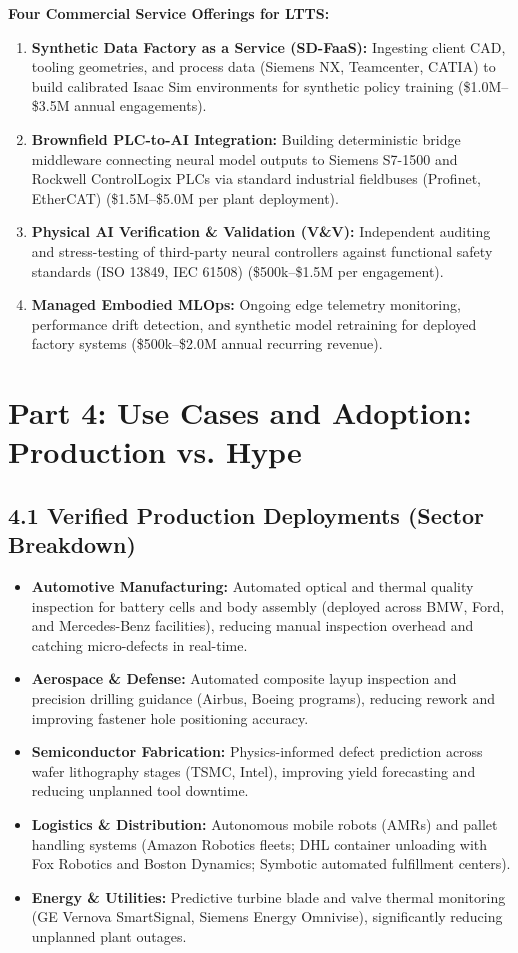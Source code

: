 \documentclass[11pt,a4paper]{article}
\begin{document}
\textbf{Four Commercial Service Offerings for LTTS:}
\begin{enumerate}
    \item \textbf{Synthetic Data Factory as a Service (SD-FaaS):} Ingesting client CAD, tooling geometries, and process data (Siemens NX, Teamcenter, CATIA) to build calibrated Isaac Sim environments for synthetic policy training (\$1.0M--\$3.5M annual engagements).
    \item \textbf{Brownfield PLC-to-AI Integration:} Building deterministic bridge middleware connecting neural model outputs to Siemens S7-1500 and Rockwell ControlLogix PLCs via standard industrial fieldbuses (Profinet, EtherCAT) (\$1.5M--\$5.0M per plant deployment).
    \item \textbf{Physical AI Verification \& Validation (V\&V):} Independent auditing and stress-testing of third-party neural controllers against functional safety standards (ISO 13849, IEC 61508) (\$500k--\$1.5M per engagement).
    \item \textbf{Managed Embodied MLOps:} Ongoing edge telemetry monitoring, performance drift detection, and synthetic model retraining for deployed factory systems (\$500k--\$2.0M annual recurring revenue).
\end{enumerate}

\section{Part 4: Use Cases and Adoption: Production vs. Hype}

\subsection{4.1 Verified Production Deployments (Sector Breakdown)}
\begin{itemize}
    \item \textbf{Automotive Manufacturing:}
    Automated optical and thermal quality inspection for battery cells and body assembly (deployed across BMW, Ford, and Mercedes-Benz facilities), reducing manual inspection overhead and catching micro-defects in real-time.
    \item \textbf{Aerospace \& Defense:}
    Automated composite layup inspection and precision drilling guidance (Airbus, Boeing programs), reducing rework and improving fastener hole positioning accuracy.
    \item \textbf{Semiconductor Fabrication:}
    Physics-informed defect prediction across wafer lithography stages (TSMC, Intel), improving yield forecasting and reducing unplanned tool downtime.
    \item \textbf{Logistics \& Distribution:}
    Autonomous mobile robots (AMRs) and pallet handling systems (Amazon Robotics fleets; DHL container unloading with Fox Robotics and Boston Dynamics; Symbotic automated fulfillment centers).
    \item \textbf{Energy \& Utilities:}
    Predictive turbine blade and valve thermal monitoring (GE Vernova SmartSignal, Siemens Energy Omnivise), significantly reducing unplanned plant outages.
\end{itemize}
\end{document}
